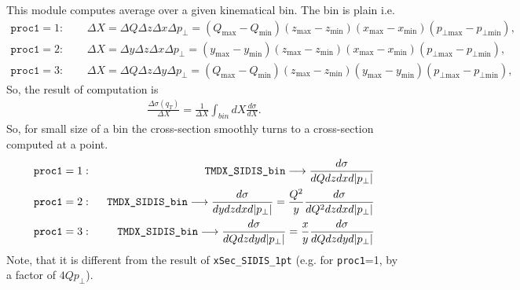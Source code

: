 \documentclass[prd,nofootinbib,eqsecnum,final]{revtex4}
\renewcommand{\(}{\left(}
\renewcommand{\)}{\right)}
\renewcommand{\[}{\left[}
\renewcommand{\]}{\right]}
\begin{document}
This module computes average over a given kinematical bin. The bin is plain i.e.
\begin{eqnarray}
\texttt{proc1}=1:~~&&\Delta X=\Delta Q \Delta z \Delta x \Delta p_\perp = 
(Q_{\text{max}}-Q_{\text{min}})
(z_{\text{max}}-z_{\text{min}})
(x_{\text{max}}-x_{\text{min}})
(p_{\perp\text{max}}-p_{\perp\text{min}}),
\\
\texttt{proc1}=2:~~&&\Delta X=\Delta y \Delta z \Delta x \Delta p_\perp = 
(y_{\text{max}}-y_{\text{min}})
(z_{\text{max}}-z_{\text{min}})
(x_{\text{max}}-x_{\text{min}})
(p_{\perp\text{max}}-p_{\perp\text{min}}),
\\
\texttt{proc1}=3:~~&&\Delta X=\Delta Q \Delta z \Delta y \Delta p_\perp = 
(Q_{\text{max}}-Q_{\text{min}})
(z_{\text{max}}-z_{\text{min}})
(y_{\text{max}}-y_{\text{min}})
(p_{\perp\text{max}}-p_{\perp\text{min}}),
\end{eqnarray}
So, the result of computation is
\begin{eqnarray}
\frac{\Delta\sigma(q_T)}{\Delta X}=\frac{1}{\Delta X}\int_{bin} dX \frac{d\sigma}{dX}.
\end{eqnarray}
So, for small size of a bin the cross-section smoothly turns to a cross-section computed at a point.
\begin{eqnarray}
\texttt{proc1}=1:~~&&\text{\texttt{TMDX\_SIDIS{\_}bin}}\longrightarrow \frac{d\sigma}{dQ dz dx  d|p_\perp|}
\\
\texttt{proc1}=2:~~&&\text{\texttt{TMDX\_SIDIS{\_}bin}}\longrightarrow \frac{d\sigma}{dy dz dx  d|p_\perp|}=\frac{Q^2}{y}\frac{d\sigma}{dQ^2 dz dx  d|p_\perp|}
\\
\texttt{proc1}=3:~~&&\text{\texttt{TMDX\_SIDIS{\_}bin}}\longrightarrow \frac{d\sigma}{dQ dz dy  d|p_\perp|}=\frac{x}{y}\frac{d\sigma}{dQ dz dy  d|p_\perp|}
\end{eqnarray}
Note, that it is different from the result of \texttt{xSec\_SIDIS\_1pt} (e.g. for \texttt{proc1}=1, by a factor of $4Qp_\perp$).
\end{document}
